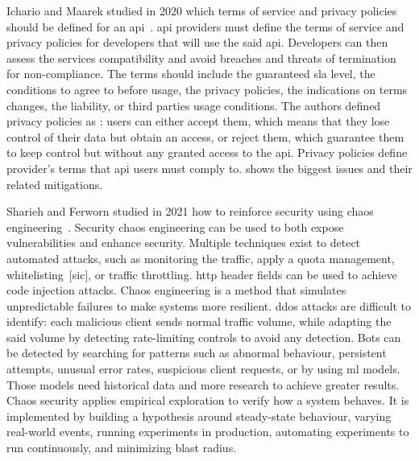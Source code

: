 Ichario and Maarek studied in 2020 which terms of service and privacy policies should be defined for an \gls{api}~\cite{ichario_vision_2020}. \gls{api} providers must define the terms of service and privacy policies for developers that will use the said \gls{api}. Developers can then assess the services compatibility and avoid breaches and threats of termination for non-compliance. The terms should include the guaranteed \gls{sla} level, the conditions to agree to before usage, the privacy policies, the indications on terms changes, the liability, or third parties usage conditions. The authors defined privacy policies as : users can either accept them, which means that they lose control of their data but obtain an access, or reject them, which guarantee them to keep control but without any granted access to the \gls{api}. Privacy policies define provider's terms that \gls{api} users must comply to.  shows the biggest issues and their related mitigations. %


Sharieh and Ferworn studied in 2021 how to reinforce security using chaos engineering~\cite{sharieh_securing_2021}. Security chaos engineering can be used to both expose vulnerabilities and enhance security. Multiple techniques exist to detect automated attacks, such as monitoring the traffic, apply a quota management, whitelisting~[sic], or traffic throttling. \gls{http} header fields can be used to achieve code injection attacks. Chaos engineering is a method that simulates unpredictable failures to make systems more resilient. \gls{ddos} attacks are difficult to identify: each malicious client sends normal traffic volume, while adapting the said volume by detecting rate-limiting controls to avoid any detection. Bots can be detected by searching for patterns such as abnormal behaviour, persistent attempts, unusual error rates, suspicious client requests, or by using \gls{ml} models. Those models need historical data and more research to achieve greater results. Chaos security applies empirical exploration to verify how a system behaves. It is implemented by building a hypothesis around steady-state behaviour, varying real-world events, running experiments in production, automating experiments to run continuously, and minimizing blast radius. %


